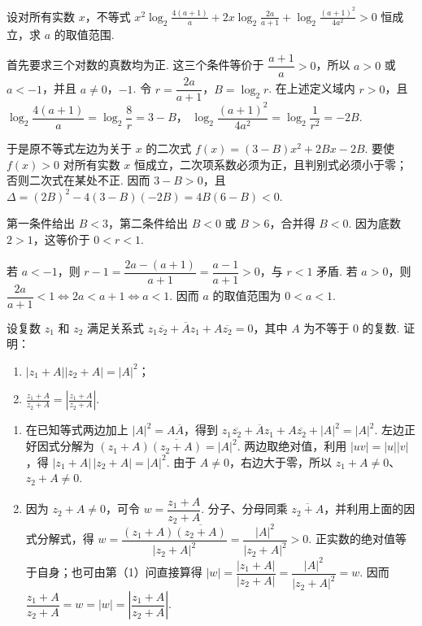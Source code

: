 \begin{problem}

设对所有实数 \(x\)，不等式 \(x^2\log_2 \frac{4(a + 1)}{a} + 2x\log_2 \frac{2a}{a + 1} + \log_2 \frac{(a + 1)^2}{4a^2} > 0\) 恒成立，求 \(a\) 的取值范围.
\end{problem}

\begin{solution}
首先要求三个对数的真数均为正. 这三个条件等价于
\(\dfrac{a+1}{a}>0\)，所以 \(a>0\) 或 \(a<-1\)，并且 \(a\ne0\)，\(-1\). 令
\(r=\dfrac{2a}{a+1}\)，\(B=\log_2 r\). 在上述定义域内 \(r>0\)，且
\(\log_2\dfrac{4(a+1)}a=\log_2\dfrac8r=3-B\)，
\(\log_2\dfrac{(a+1)^2}{4a^2}=\log_2\dfrac1{r^2}=-2B\).

于是原不等式左边为关于 \(x\) 的二次式
\(f(x)=(3-B)x^2+2Bx-2B\). 要使 \(f(x)>0\) 对所有实数 \(x\) 恒成立，二次项系数必须为正，且判别式必须小于零；否则二次式在某处不正. 因而
\(3-B>0\)，且
\(\Delta=(2B)^2-4(3-B)(-2B)=4B(6-B)<0\).

第一条件给出 \(B<3\)，第二条件给出 \(B<0\) 或 \(B>6\)，合并得 \(B<0\). 因为底数 \(2>1\)，这等价于 \(0<r<1\).

若 \(a<-1\)，则
\(r-1=\dfrac{2a-(a+1)}{a+1}=\dfrac{a-1}{a+1}>0\)，与 \(r<1\) 矛盾. 若 \(a>0\)，则
\(\dfrac{2a}{a+1}<1\Longleftrightarrow 2a<a+1\Longleftrightarrow a<1\). 因而 \(a\) 的取值范围为 \(0<a<1\).
\end{solution}

\begin{problem}

设复数 \(z_1\) 和 \(z_2\) 满足关系式 \(z_1\overline{z_2} + \overline{A}z_1 + A\overline{z_2} = 0\)，其中 \(A\) 为不等于 \(0\) 的复数. 证明：

\begin{enumerate}
\item \(|z_1 + A||z_2 + A| = |A|^2\)；
\item \(\frac{z_1 + A}{z_2 + A} = \left|\frac{z_1 + A}{z_2 + A}\right|\).
\end{enumerate}
\end{problem}

\begin{solution}
\begin{enumerate}
\item 在已知等式两边加上 \(|A|^2=A\overline A\)，得到
\(z_1\overline{z_2}+\overline A z_1+A\overline{z_2}+|A|^2=|A|^2\). 左边正好因式分解为
\((z_1+A)\overline{(z_2+A)}=|A|^2\). 两边取绝对值，利用 \(|uv|=|u||v|\)，得
\(|z_1+A|\,|z_2+A|=|A|^2\). 由于 \(A\ne0\)，右边大于零，所以 \(z_1+A\ne0\)、\(z_2+A\ne0\).

\item 因为 \(z_2+A\ne0\)，可令 \(w=\dfrac{z_1+A}{z_2+A}\). 分子、分母同乘 \(\overline{z_2+A}\)，并利用上面的因式分解式，得
\(w=\dfrac{(z_1+A)\overline{(z_2+A)}}{|z_2+A|^2}=\dfrac{|A|^2}{|z_2+A|^2}>0\). 正实数的绝对值等于自身；也可由第（1）问直接算得
\(|w|=\dfrac{|z_1+A|}{|z_2+A|}=\dfrac{|A|^2}{|z_2+A|^2}=w\). 因而
\(\dfrac{z_1+A}{z_2+A}=w=|w|=\left|\dfrac{z_1+A}{z_2+A}\right|\).
\end{enumerate}
\end{solution}

